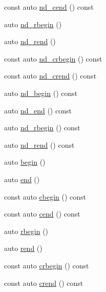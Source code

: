 \begin{DoxyCompactItemize}
\item 
const auto \hyperlink{classBC_1_1tensors_1_1Tensor__IterAlgos_a276eaf0f6dc4b230f225173ab35b27d7}{nd\+\_\+cend} () const 
\item 
auto \hyperlink{classBC_1_1tensors_1_1Tensor__IterAlgos_a648c99d893f92a4f91536128b0650b28}{nd\+\_\+rbegin} ()
\item 
auto \hyperlink{classBC_1_1tensors_1_1Tensor__IterAlgos_a8109154106e723b1957c6c22e14ab9b5}{nd\+\_\+rend} ()
\item 
const auto \hyperlink{classBC_1_1tensors_1_1Tensor__IterAlgos_a8d011e41ed73cfa8f5626ac36dbfff4c}{nd\+\_\+crbegin} () const 
\item 
const auto \hyperlink{classBC_1_1tensors_1_1Tensor__IterAlgos_ae339055ef0b67344d2f784176c448918}{nd\+\_\+crend} () const 
\item 
auto \hyperlink{classBC_1_1tensors_1_1Tensor__IterAlgos_a3e30c2acb2b5295ffd5e0129f8655889}{nd\+\_\+begin} () const 
\item 
auto \hyperlink{classBC_1_1tensors_1_1Tensor__IterAlgos_acab98556d989216eaab14ea4823db69f}{nd\+\_\+end} () const 
\item 
auto \hyperlink{classBC_1_1tensors_1_1Tensor__IterAlgos_a4ec544035a587ead2300a9e235fbf432}{nd\+\_\+rbegin} () const 
\item 
auto \hyperlink{classBC_1_1tensors_1_1Tensor__IterAlgos_ad8c5b59d3c0562ee016fcc56a046ab40}{nd\+\_\+rend} () const 
\item 
auto \hyperlink{classBC_1_1tensors_1_1Tensor__IterAlgos_a73b44ff31a6c22a172e03f31af4e4d64}{begin} ()
\item 
auto \hyperlink{classBC_1_1tensors_1_1Tensor__IterAlgos_a5bb5cbc94944c7225db9fd594656f011}{end} ()
\item 
const auto \hyperlink{classBC_1_1tensors_1_1Tensor__IterAlgos_a0a214185bf9b5fe40ddef31f1719686d}{cbegin} () const 
\item 
const auto \hyperlink{classBC_1_1tensors_1_1Tensor__IterAlgos_ac6f987f8012fcc81d85842fb03978678}{cend} () const 
\item 
auto \hyperlink{classBC_1_1tensors_1_1Tensor__IterAlgos_a416bf162b627e263be51c3939d25a38b}{rbegin} ()
\item 
auto \hyperlink{classBC_1_1tensors_1_1Tensor__IterAlgos_adec36bd5bba166de15c61579fcd5119b}{rend} ()
\item 
const auto \hyperlink{classBC_1_1tensors_1_1Tensor__IterAlgos_a20f2c25f0d3dd50a633b77c82f106223}{crbegin} () const 
\item 
const auto \hyperlink{classBC_1_1tensors_1_1Tensor__IterAlgos_a96bcee57bc8b716fc4f472ff9147c6d2}{crend} () const 

\end{DoxyCompactItemize}

